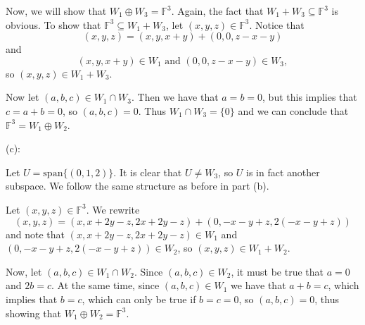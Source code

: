 \documentclass{article}
\theoremstyle{plain} %
\numberwithin{thm}{section} %
\theoremstyle{definition}
\begin{document}
\begin{question}{8}
        Now, we will show that \(W_1 \oplus W_3 = \mathbb{F}^3\). Again, the fact that \(W_1 + W_3 \subseteq \mathbb{F}^3\) is obvious. To show that \(\mathbb{F}^3 \subseteq W_1 + W_3\), let \((x,y,z) \in \mathbb{F}^3\). Notice that
        \[
            (x,y,z) = (x,y,x+y) + (0, 0, z - x - y)
        \]
        and
        \[
            (x,y,x+y) \in W_1 \text{ and } (0,0,z-x-y) \in W_3,
        \]
        so \((x,y,z) \in W_1 + W_3\).

        Now let \((a,b,c) \in W_1 \cap W_3\). Then we have that \(a = b = 0\), but this implies that \(c = a + b = 0\), so \((a,b,c) = 0\). Thus \(W_1 \cap W_3 = \{ 0 \}\) and we can conclude that \(\mathbb{F}^3 = W_1 \oplus W_2\).

        \medskip

        (c):

        Let \(U = \mathrm{span} \{ (0,1,2) \}\). It is clear that \(U \neq W_3\), so \(U\) is in fact another subspace. We follow the same structure as before in part (b).

        Let \((x,y,z) \in \mathbb{F}^3\). We rewrite
        \[
            (x,y,z) = \left( x, x +2y-z, 2x+2y-z\right) + \left( 0,  - x - y + z, 2(- x - y + z)\right) 
        \]
        and note that \(\left( x, x +2y-z, 2x+2y-z\right) \in W_1\) and \(\left( 0,  - x - y + z, 2(- x - y + z)\right) \in W_2\), so \((x,y,z) \in W_1 + W_2\).

        Now, let \((a,b,c) \in W_1 \cap W_2\). Since \((a,b,c) \in W_2\), it must be true that \(a = 0\) and \(2b = c\). At the same time, since \((a,b,c) \in W_1\) we have that \(a + b = c\), which implies that \(b=c\), which can only be true if \(b = c = 0\), so \((a,b,c) = 0\), thus showing that \(W_1 \oplus W_2 = \mathbb{F}^3\).
    \end{question}
    \newpage
\end{document}
